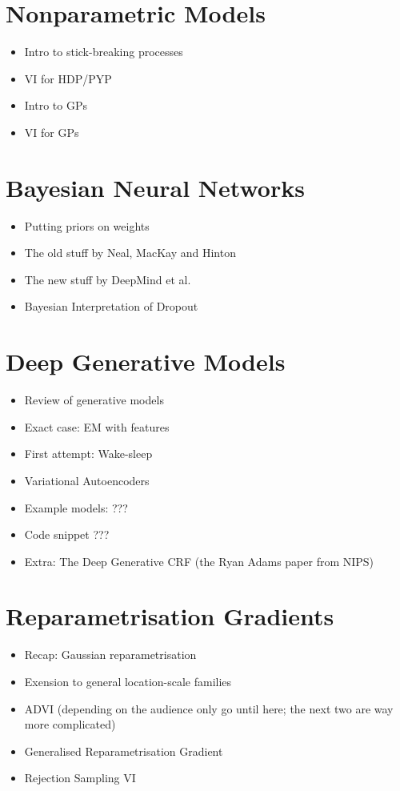 \documentclass[11pt, a4paper]{article}
\begin{document}
\section{Nonparametric Models}
\begin{itemize}
\item Intro to stick-breaking processes \citep{IshwaranJames:2001}
\item VI for HDP/PYP \citep{WangEtAl:2011}
\item Intro to GPs
\item VI for GPs
\end{itemize}

\section{Bayesian Neural Networks}
\begin{itemize}
\item Putting priors on weights
\item The old stuff by Neal, MacKay and Hinton \citep{HintonVancamp:1993}
\item The new stuff by DeepMind et al. \citep{Graves:2011, BlundellEtAl:2015}
\item Bayesian Interpretation of Dropout \citep{Gal:2016}
\end{itemize}

\section{Deep Generative Models}
\begin{itemize}
\item Review of generative models
\item Exact case: EM with features \citep{BergkirkpatrickEtAl:2010}
\item First attempt: Wake-sleep \citep{HintonEtAl:1995}
\item Variational Autoencoders \citep{KingmaWelling:2013, RezendeEtAl:2014}
\item Example models: ???
\item Code snippet ???
\item Extra: The Deep Generative CRF (the Ryan Adams paper from NIPS)
\end{itemize}

\section{Reparametrisation Gradients}
\begin{itemize}
\item Recap: Gaussian reparametrisation 
\item Exension to general location-scale families \citep{TitsiasLazarogredilla:2014}
\item ADVI (depending on the audience only go until here; the next two are way more complicated) \citep{KucukelbirEtAl:2017}
\item Generalised Reparametrisation Gradient \citep{RuizEtAl:2016}
\item Rejection Sampling VI \citep{NaessethEtAl:2017}
\end{itemize}
\end{document}
